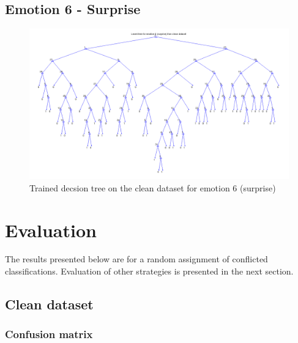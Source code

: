 \documentclass[a4paper]{article}
\begin{document}
\subsection{Emotion 6 - Surprise}
\begin{figure}[H]
\center
\includegraphics[width=0.9\columnwidth]{SurpriseTree} %
\caption{Trained decsion tree on the clean dataset for emotion 6 (surprise)}
\end{figure}

\clearpage


\section{Evaluation}

The results presented below are for a random assignment of conflicted classifications. Evaluation of other strategies is presented in the next section.

\subsection{Clean dataset}
\subsubsection{Confusion matrix}
\end{document}
